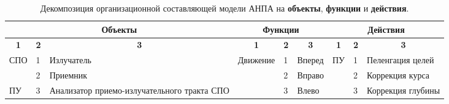 \begin{landscape}
\begin{longtable}[c]{llm{}||l|l|m{}||llm{}}
\caption[Декомпозиция организационной составляющей]
    {Декомпозиция организационной составляющей модели АНПА на \textbf{объекты}, \textbf{функции} и \textbf{действия}.}
\label{tbl:model_anpa_decompose}\\
\hline
\multicolumn{3}{|c||}{\textbf{Объекты}}                                                                                     & \multicolumn{3}{c||}{\textbf{Функции}}                                                                  & \multicolumn{3}{c|}{\textbf{Действия}}                                                                                                  \\ \hline
\endhead
%
\multicolumn{1}{|c|}{\textbf{1}}           & \multicolumn{1}{c|}{\textbf{2}} & \multicolumn{1}{c||}{\textbf{3}}            & \multicolumn{1}{c|}{\textbf{1}}   & \multicolumn{1}{c|}{\textbf{2}} & \multicolumn{1}{c||}{\textbf{3}} & \multicolumn{1}{c|}{\textbf{1}}           & \multicolumn{1}{c|}{\textbf{2}} & \multicolumn{1}{c|}{\textbf{3}}                           \\ \hline
\multicolumn{1}{|l|}{\multirow{2}{*}{СПО}} & \multicolumn{1}{l|}{1}          & Излучатель                                  & \multirow{5}{*}{Движение}         & 1                               & Вперед                           & \multicolumn{1}{l|}{\multirow{3}{*}{ПУ}}  & \multicolumn{1}{l|}{1}          & \multicolumn{1}{l|}{Пеленгация целей}                     \\ \cline{2-3} \cline{5-6} \cline{8-9} 
\multicolumn{1}{|l|}{}                     & \multicolumn{1}{l|}{2}          & Приемник                                    &                                   & 2                               & Вправо                           & \multicolumn{1}{l|}{}                     & \multicolumn{1}{l|}{2}          & \multicolumn{1}{l|}{Коррекция курса}                      \\ \cline{1-3} \cline{5-6} \cline{8-9} 
\multicolumn{1}{|l|}{\multirow{4}{*}{ПУ}}  & \multicolumn{1}{l|}{3}          & Анализатор приемо-излучательного тракта СПО &                                   & 3                               & Влево                            & \multicolumn{1}{l|}{}                     & \multicolumn{1}{l|}{3}          & \multicolumn{1}{l|}{Коррекция глубины}                    \\ \cline{2-3} \cline{5-9} 

\end{longtable}
\end{landscape}
